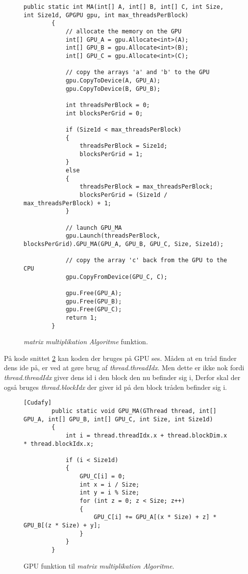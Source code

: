 \begin{figure}[h]
    \centering
    \lstset{style=sharpc}
	\begin{lstlisting}
public static int MA(int[] A, int[] B, int[] C, int Size, int Size1d, GPGPU gpu, int max_threadsPerBlock)
        {
            // allocate the memory on the GPU
            int[] GPU_A = gpu.Allocate<int>(A);
            int[] GPU_B = gpu.Allocate<int>(B);
            int[] GPU_C = gpu.Allocate<int>(C);

            // copy the arrays 'a' and 'b' to the GPU
            gpu.CopyToDevice(A, GPU_A);
            gpu.CopyToDevice(B, GPU_B);

            int threadsPerBlock = 0;
            int blocksPerGrid = 0;

            if (Size1d < max_threadsPerBlock)
            {
                threadsPerBlock = Size1d;
                blocksPerGrid = 1;
            }
            else
            {
                threadsPerBlock = max_threadsPerBlock;
                blocksPerGrid = (Size1d / max_threadsPerBlock) + 1;
            }

            // launch GPU_MA
            gpu.Launch(threadsPerBlock, blocksPerGrid).GPU_MA(GPU_A, GPU_B, GPU_C, Size, Size1d);

            // copy the array 'c' back from the GPU to the CPU
            gpu.CopyFromDevice(GPU_C, C);

            gpu.Free(GPU_A);
            gpu.Free(GPU_B);
            gpu.Free(GPU_C);
            return 1;
        }
	\end{lstlisting}
    \caption{\textit{matrix multiplikation Algoritme} funktion.}
    \label{fig:MA}
\end{figure}

På kode snittet \ref{fig:GPU_MA} kan koden der bruges på GPU ses. Måden at en tråd finder dens ide på, er ved at gøre brug af \textit{thread.threadIdx}. Men dette er ikke nok fordi \textit{thread.threadIdx} giver dens id i den block den nu befinder sig i, Derfor skal der også bruges \textit{thread.blockIdx} der giver id på den block tråden befinder sig i.

\begin{figure}[h]
    \centering
    \lstset{style=sharpc}
	\begin{lstlisting}
[Cudafy]
        public static void GPU_MA(GThread thread, int[] GPU_A, int[] GPU_B, int[] GPU_C, int Size, int Size1d)
        {
            int i = thread.threadIdx.x + thread.blockDim.x * thread.blockIdx.x;

            if (i < Size1d)
            {
                GPU_C[i] = 0;
                int x = i / Size;
                int y = i % Size;
                for (int z = 0; z < Size; z++)
                {
                    GPU_C[i] += GPU_A[(x * Size) + z] * GPU_B[(z * Size) + y];
                }
            }
        }
	\end{lstlisting}
    \caption{GPU funktion til \textit{matrix multiplikation Algoritme}.}
    \label{fig:GPU_MA}
\end{figure}

